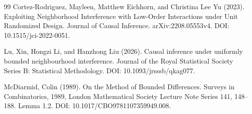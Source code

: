 \documentclass{article}
\begin{document}
\begin{thebibliography}{99}
   Cortez-Rodriguez, Mayleen, Matthew Eichhorn, and Christina Lee Yu (2023). Exploiting Neighborhood Interference with Low-Order Interactions under Unit Randomized Design. Journal of Causal Inference. arXiv:2208.05553v4. DOI: 10.1515/jci-2022-0051.

   Lu, Xin, Hongzi Li, and Hanzhong Liu (2026). Causal inference under uniformly bounded neighbourhood interference. Journal of the Royal Statistical Society Series B: Statistical Methodology. DOI: 10.1093/jrsssb/qkag077.

   McDiarmid, Colin (1989). On the Method of Bounded Differences. Surveys in Combinatorics, 1989, London Mathematical Society Lecture Note Series 141, 148--188. Lemma 1.2. DOI: 10.1017/CBO9781107359949.008.

\end{thebibliography}
\end{document}
